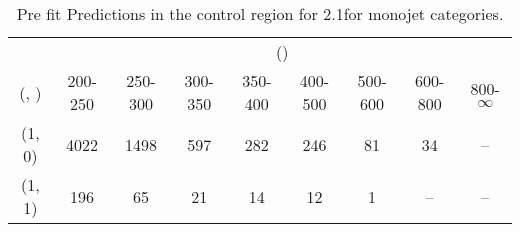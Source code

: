 \begin{table}[h!]
\tiny
\centering
\caption{Pre fit Predictions in the \mj control region for 2.1\ifb for monojet categories.\label{tab:predsepnaive_mu_data_mono}}
\begin{tabular}
{ccccccccc}
	\hline\hline
	& \multicolumn{8}{c}{\scalht (\gev)} \\ 
	 (\njet,  \nb) & 200-250 & 250-300 & 300-350 & 350-400 & 400-500 & 500-600 & 600-800 & 800-$\infty$ \\ [0.8ex] 
\hline
	(1, 0) & 4022 & 1498 & 597 & 282 & 246 & 81 & 34 & -- \\[0.5ex] 
	(1, 1) & 196 & 65 & 21 & 14 & 12 & 1 & -- & -- \\[0.5ex] 
	\hline
	\hline
\end{tabular}
\end{table}
